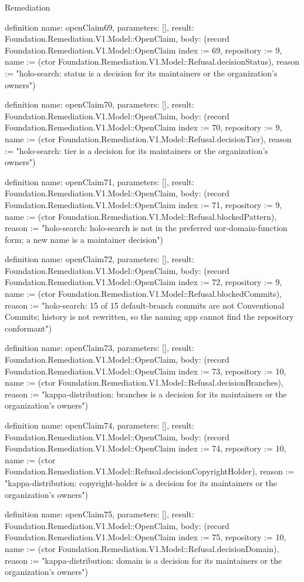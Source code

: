 \begin{lexlean}{Remediation}
\begin{semanticmodule}
definition{
  name: openClaim69,
  parameters: [],
  result: Foundation.Remediation.V1.Model::OpenClaim,
  body: (record Foundation.Remediation.V1.Model::OpenClaim {index := 69, repository := 9, name := (ctor Foundation.Remediation.V1.Model::Refusal.decisionStatus), reason := "holo-search: status is a decision for its maintainers or the organization's owners"})
}

definition{
  name: openClaim70,
  parameters: [],
  result: Foundation.Remediation.V1.Model::OpenClaim,
  body: (record Foundation.Remediation.V1.Model::OpenClaim {index := 70, repository := 9, name := (ctor Foundation.Remediation.V1.Model::Refusal.decisionTier), reason := "holo-search: tier is a decision for its maintainers or the organization's owners"})
}

definition{
  name: openClaim71,
  parameters: [],
  result: Foundation.Remediation.V1.Model::OpenClaim,
  body: (record Foundation.Remediation.V1.Model::OpenClaim {index := 71, repository := 9, name := (ctor Foundation.Remediation.V1.Model::Refusal.blockedPattern), reason := "holo-search: holo-search is not in the preferred uor-{domain}-{function} form; a new name is a maintainer decision"})
}

definition{
  name: openClaim72,
  parameters: [],
  result: Foundation.Remediation.V1.Model::OpenClaim,
  body: (record Foundation.Remediation.V1.Model::OpenClaim {index := 72, repository := 9, name := (ctor Foundation.Remediation.V1.Model::Refusal.blockedCommits), reason := "holo-search: 15 of 15 default-branch commits are not Conventional Commits; history is not rewritten, so the naming app cannot find the repository conformant"})
}

definition{
  name: openClaim73,
  parameters: [],
  result: Foundation.Remediation.V1.Model::OpenClaim,
  body: (record Foundation.Remediation.V1.Model::OpenClaim {index := 73, repository := 10, name := (ctor Foundation.Remediation.V1.Model::Refusal.decisionBranches), reason := "kappa-distribution: branches is a decision for its maintainers or the organization's owners"})
}

definition{
  name: openClaim74,
  parameters: [],
  result: Foundation.Remediation.V1.Model::OpenClaim,
  body: (record Foundation.Remediation.V1.Model::OpenClaim {index := 74, repository := 10, name := (ctor Foundation.Remediation.V1.Model::Refusal.decisionCopyrightHolder), reason := "kappa-distribution: copyright-holder is a decision for its maintainers or the organization's owners"})
}

definition{
  name: openClaim75,
  parameters: [],
  result: Foundation.Remediation.V1.Model::OpenClaim,
  body: (record Foundation.Remediation.V1.Model::OpenClaim {index := 75, repository := 10, name := (ctor Foundation.Remediation.V1.Model::Refusal.decisionDomain), reason := "kappa-distribution: domain is a decision for its maintainers or the organization's owners"})
}


\end{semanticmodule}
\end{lexlean}
